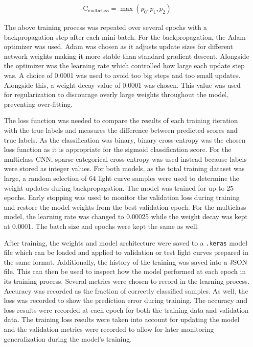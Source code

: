 \begin{align}
    \text{C}_{\text{multiclass}} = \max{(p_0, p_1, p_2)}\label{eq:mc_confidence}
\end{align}

The above training process was repeated over several epochs with a backpropagation step after each mini-batch. For the backpropagation, the Adam optimizer was used. Adam was chosen as it adjusts update sizes for different network weights making it more stable than standard gradient descent. Alongside the optimizer was the learning rate which controlled how large each update step was. A choice of 0.0001 was used to avoid too big steps and too small updates. Alongside this, a weight decay value of 0.0001 was chosen. This value was used for regularization to discourage overly large weights throughout the model, preventing over-fitting.

The loss function was needed to compare the results of each training iteration with the true labels and measures the difference between predicted scores and true labels. As the classification was binary, binary cross-entropy was the chosen loss function as it is appropriate for the sigmoid classification score. For the multiclass CNN, sparse categorical cross-entropy was used instead because labels were stored as integer values. For both models, as the total training dataset was large, a random selection of $64$ light curve samples were used to determine the weight updates during backpropagation. The model was trained for up to 25 epochs. Early stopping was used to monitor the validation loss during training and restore the model weights from the best validation epoch. For the multiclass model, the learning rate was changed to 0.00025 while the weight decay was kept at 0.0001. The batch size and epochs were kept the same as well.

After training, the weights and model architecture were saved to a \texttt{.keras} model file which can be loaded and applied to validation or test light curves prepared in the same format. Additionally, the history of the training was saved into a JSON file. This can then be used to inspect how the model performed at each epoch in its training process. Several metrics were chosen to record in the learning process. Accuracy was recorded as the fraction of correctly classified samples. As well, the loss was recorded to show the prediction error during training. The accuracy and loss results were recorded at each epoch for both the training data and validation data. The training loss results were taken into account for updating the model and the validation metrics were recorded to allow for later monitoring generalization during the model's training.


